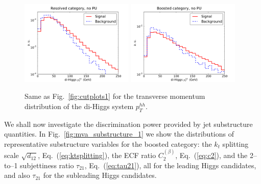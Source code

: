 \begin{figure}[t]
\begin{center}
  \includegraphics[width=0.48\textwidth]{plots/pt_HH_C2_res_noPU.pdf}
  \includegraphics[width=0.48\textwidth]{plots/pt_HH_C2_bst_noPU.pdf}
  \caption{\small Same as Fig.~\ref{fig:cutplots1} for the transverse momentum
    distribution of the di-Higgs system $p_T^{hh}$.
}
\label{fig:pthh}
\end{center}
\end{figure}

We shall now investigate the discrimination power
provided by jet substructure
quantities.
%
In Fig.~\ref{fig:mva_substructure_1}
we show the distributions of representative
 substructure variables for the boosted category: the
$k_t$ splitting scale $\sqrt{d_{12}}$, Eq.~(\ref{eq:ktsplitting}), 
the ECF ratio $C_2^{(\beta)}$,
Eq.~(\ref{eq:c2}), and
the 2--to--1 subjettiness ratio $\tau_{21}$, Eq.~(\ref{eq:tau21}),
all for the leading
Higgs candidates, and also $\tau_{21}$ for the subleading
Higgs candidates.

